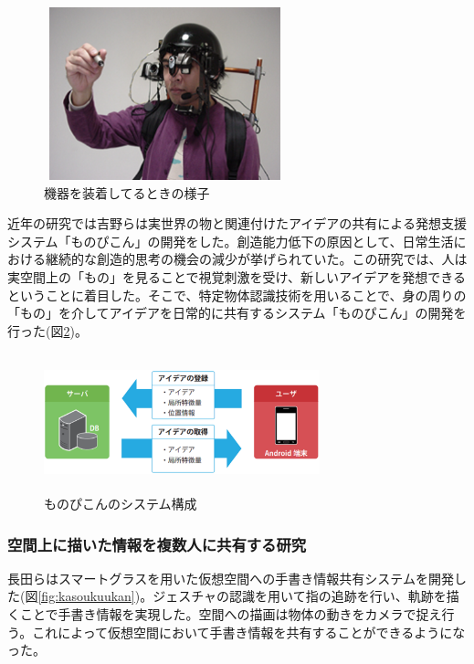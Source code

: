 \documentclass[11pt,a4j, titlepage]{jarticle} %
\begin{document}
\begin{figure}[H]
  \begin{center}
    \includegraphics[clip,height=5.0cm,width=7.0cm]{./informal2.eps}
    \caption{機器を装着してるときの様子}
    \label{fig:informal2}
  \end{center}
\end{figure}

近年の研究では吉野ら\cite{yoshino}は実世界の物と関連付けたアイデアの共有による発想支援システム「ものぴこん」の開発をした。創造能力低下の原因として、日常生活における継続的な創造的思考の機会の減少が挙げられていた。この研究では、人は実空間上の「もの」を見ることで視覚刺激を受け、新しいアイデアを発想できるということに着目した。そこで、特定物体認識技術を用いることで、身の周りの「もの」を介してアイデアを日常的に共有するシステム「ものぴこん」の開発を行った(図\ref{fig:monopikon})。

\begin{figure}[H]
  \begin{center}
    \includegraphics[clip,height=4.0cm,width=8.0cm]{./monopikon.eps}
    \caption{ものぴこんのシステム構成}
    \label{fig:monopikon}
  \end{center}
\end{figure}

\subsubsection{空間上に描いた情報を複数人に共有する研究}
長田ら\cite{nagata}はスマートグラスを用いた仮想空間への手書き情報共有システムを開発した(図\ref{fig:kasoukuukan})。ジェスチャの認識を用いて指の追跡を行い、軌跡を描くことで手書き情報を実現した。空間への描画は物体の動きをカメラで捉え行う。これによって仮想空間において手書き情報を共有することができるようになった。
\end{document}

